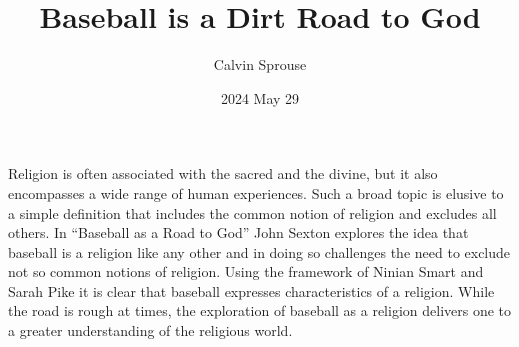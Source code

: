 \documentclass[a4paper, 12pt]{article}
\title{Baseball is a Dirt Road to God}
\author{Calvin Sprouse}
\affil{RELS 101 World Religions}
\date{2024 May 29}
\begin{document}
\maketitle

Religion is often associated with the sacred and the divine, but it also encompasses a wide range of human experiences. Such a broad topic is elusive to a simple definition that includes the common notion of religion and excludes all others. In ``Baseball as a Road to God'' John Sexton explores the idea that baseball is a religion like any other and in doing so challenges the need to exclude not so common notions of religion. Using the framework of Ninian Smart and Sarah Pike it is clear that baseball expresses characteristics of a religion. While the road is rough at times, the exploration of baseball as a religion delivers one to a greater understanding of the religious world.
\end{document}
